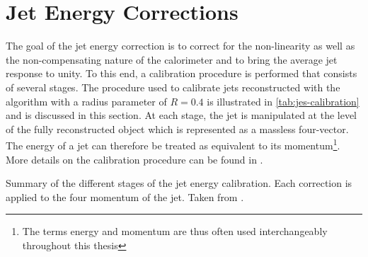 \section{Jet Energy Corrections}
\label{sec:jes-calibration}
The goal of the jet energy correction is to correct for the non-linearity as well as the non-compensating nature of the calorimeter and to bring the average jet response to unity.
To this end, a calibration procedure is performed that consists of several stages. The procedure used to calibrate jets reconstructed with the \antikt algorithm with a radius parameter of $R = 0.4$ is illustrated in \cref{tab:jes-calibration} and is discussed in this section. At each stage, the jet is manipulated at the level of the fully reconstructed object which is represented as a massless four-vector. The energy of a jet can therefore be treated as equivalent to its momentum\footnote{The terms energy and momentum are thus often used interchangeably throughout this thesis}. More details on the calibration procedure can be found in .

\begin{table}
    \caption{Summary of the different stages of the jet energy calibration. Each correction is applied to the four momentum of the jet. Taken from .}
    \label{tab:jes-calibration}
\end{table}

